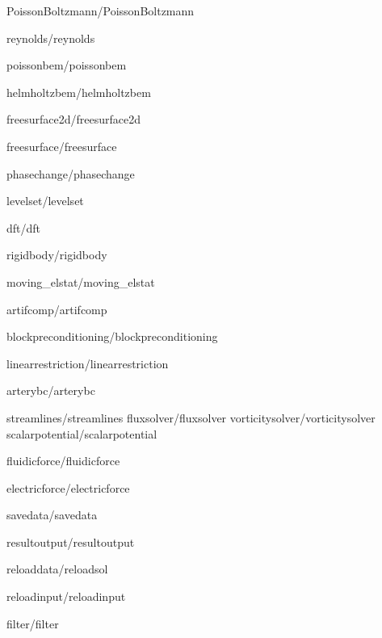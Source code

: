 \documentclass[a4paper,english,10pt]{report}    %
\newcommand{\Include}{}
\begin{document}
\graphicspath{{./}{PoissonBoltzmann/}}
\Include{PoissonBoltzmann/PoissonBoltzmann}

\graphicspath{{./}{reynolds/}}
\Include{reynolds/reynolds}

\graphicspath{{./}{poissonbem/}}
\Include{poissonbem/poissonbem}

\graphicspath{{./}{helmholtzbem/}}
\Include{helmholtzbem/helmholtzbem}

\graphicspath{{./}{freesurface2d/}}
\Include{freesurface2d/freesurface2d}

\graphicspath{{./}{freesurface/}}
\Include{freesurface/freesurface}

\graphicspath{{./}{phasechange/}}
\Include{phasechange/phasechange}


\graphicspath{{./}{levelset/}}
\Include{levelset/levelset}

\graphicspath{{./}{dft/}}
\Include{dft/dft}

\graphicspath{{./}{rigidbody/}}
\Include{rigidbody/rigidbody}

\graphicspath{{./}{moving_elstat/}}
\Include{moving_elstat/moving_elstat}

\graphicspath{{./}{artifcomp/}}
\Include{artifcomp/artifcomp}

\graphicspath{{./}{blockpreconditioning/}}
\Include{blockpreconditioning/blockpreconditioning}


\graphicspath{{./}{linearrestriction/}}
\Include{linearrestriction/linearrestriction}

\graphicspath{{./}{arterybc/}}
\Include{arterybc/arterybc}

\graphicspath{{./}{streamlines/}}
\Include{streamlines/streamlines}
\Include{fluxsolver/fluxsolver}
\Include{vorticitysolver/vorticitysolver}
\Include{scalarpotential/scalarpotential}

\Include{fluidicforce/fluidicforce}
\graphicspath{{./}{electricforce/}}
\Include{electricforce/electricforce}

\graphicspath{{./}{savedata/}}
\Include{savedata/savedata}

\graphicspath{{./}{resultoutput/}}
\Include{resultoutput/resultoutput}

\graphicspath{{./}{reloaddata/}}
\Include{reloaddata/reloadsol}

\graphicspath{{./}{reloadinput/}}
\Include{reloadinput/reloadinput}

\graphicspath{{./}{filter/}}
\Include{filter/filter}


\printindex

\end{document}
